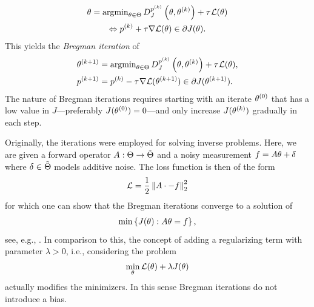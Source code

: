 %
\begin{gather}
\theta = \operatorname{argmin}_{\theta\in\Theta} D^{p^{(k)}}_J\left(\theta,\theta^{(k)}\right) + \tau^{}\mathcal{L}(\theta)
\\
\Leftrightarrow
p^{(k)} + \tau\nabla\mathcal{L}(\theta)\in \partial J(\theta). 
\end{gather}
%
This yields the \emph{Bregman iteration} of \cite{osher2005iterative}
%
%
\begin{subequations}\label{eq:bregman_iteration}
\begin{align}
\theta^{(k+1)} &= \operatorname{argmin}_{\theta\in\Theta} D^{p^{(k)}}_J\left(\theta,\theta^{(k)}\right) + \tau^{}\mathcal{L}(\theta), \\
p^{(k+1)} &= p^{(k)} - \tau^{}\nabla\mathcal{L}(\theta^{(k+1)}) \in \partial J(\theta^{(k+1)}).
\end{align}
\end{subequations}
%
The nature of Bregman iterations requires starting with an iterate $\theta^{(0)}$ that has a low value in $J$---preferably $J(\theta^{(0)}) = 0$---and only increase $J(\theta^{(k)})$ gradually in each step.
%
\begin{remark}{}{}
Originally, the iterations were employed for solving inverse problems. Here, we are given a forward operator $A:\Theta\to\tilde{\Theta}$ and a noisy measurement $f= A\theta +\delta$ where $\delta\in \tilde{\Theta}$ models additive noise. The loss function is then of the form
%
\begin{align*}
\mathcal{L} = \frac{1}{2}\left\|A\cdot - f\right\|^2_2
\end{align*}
%
for which one can show that the Bregman iterations converge to a solution of
%
\begin{align}\label{eq:Bregexact}
\min \left\{J(\theta): A\theta = f\right\},
\end{align}
%
see, e.g., \cite{osher2005iterative}. In comparison to this, the concept of adding a regularizing term with parameter $\lambda>0$, i.e., considering the problem
%
\begin{align*}
\min_\theta \mathcal{L}(\theta) + \lambda J(\theta) 
\end{align*}
%
actually modifies the minimizers. In this sense Bregman iterations do not introduce a bias.
\end{remark}
%
%
